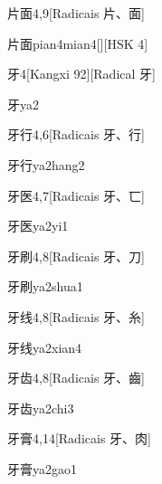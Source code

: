 \begin{entry}{片面}{4,9}[Radicais ⽚、⾯]
  \begin{phonetics}{片面}{pian4mian4}[][HSK 4]
  \end{phonetics}
\end{entry}

\begin{entry}{牙}{4}[Kangxi 92][Radical ⽛]
  \begin{phonetics}{牙}{ya2}
  \end{phonetics}
\end{entry}

\begin{entry}{牙行}{4,6}[Radicais ⽛、⾏]
  \begin{phonetics}{牙行}{ya2hang2}
  \end{phonetics}
\end{entry}

\begin{entry}{牙医}{4,7}[Radicais ⽛、⼖]
  \begin{phonetics}{牙医}{ya2yi1}
  \end{phonetics}
\end{entry}

\begin{entry}{牙刷}{4,8}[Radicais ⽛、⼑]
  \begin{phonetics}{牙刷}{ya2shua1}
  \end{phonetics}
\end{entry}

\begin{entry}{牙线}{4,8}[Radicais ⽛、⽷]
  \begin{phonetics}{牙线}{ya2xian4}
  \end{phonetics}
\end{entry}

\begin{entry}{牙齿}{4,8}[Radicais ⽛、⿒]
  \begin{phonetics}{牙齿}{ya2chi3}
  \end{phonetics}
\end{entry}

\begin{entry}{牙膏}{4,14}[Radicais ⽛、⾁]
  \begin{phonetics}{牙膏}{ya2gao1}
  \end{phonetics}
\end{entry}

